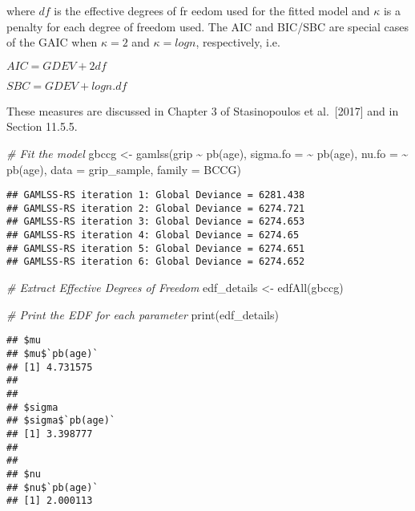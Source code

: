 \documentclass[
]{article}
\newenvironment{Shaded}{\begin{snugshade}}{\end{snugshade}}
\newcommand{\AttributeTok}[1]{\textcolor[rgb]{0.77,0.63,0.00}{#1}}
\newcommand{\CommentTok}[1]{\textcolor[rgb]{0.56,0.35,0.01}{\textit{#1}}}
\newcommand{\FunctionTok}[1]{\textcolor[rgb]{0.00,0.00,0.00}{#1}}
\newcommand{\NormalTok}[1]{#1}
\newcommand{\OtherTok}[1]{\textcolor[rgb]{0.56,0.35,0.01}{#1}}
\newcommand{\SpecialCharTok}[1]{\textcolor[rgb]{0.00,0.00,0.00}{#1}}
\begin{document}
where \(df\) is the effective degrees of fr eedom used for the fitted
model and \(\kappa\) is a penalty for each degree of freedom used. The
AIC and BIC/SBC are special cases of the GAIC when \(\kappa = 2\) and
\(\kappa = log n\), respectively, i.e.

\(AIC = GDEV + 2 df\)

\(SBC = GDEV + log n . df\)

These measures are discussed in Chapter 3 of Stasinopoulos et
al.~{[}2017{]} and in Section 11.5.5.

\begin{Shaded}
\begin{Highlighting}[]
\CommentTok{\# Fit the model}
\NormalTok{gbccg }\OtherTok{\textless{}{-}} \FunctionTok{gamlss}\NormalTok{(grip }\SpecialCharTok{\textasciitilde{}} \FunctionTok{pb}\NormalTok{(age),}
                \AttributeTok{sigma.fo =} \SpecialCharTok{\textasciitilde{}} \FunctionTok{pb}\NormalTok{(age),}
                \AttributeTok{nu.fo =} \SpecialCharTok{\textasciitilde{}} \FunctionTok{pb}\NormalTok{(age),}
                \AttributeTok{data =}\NormalTok{ grip\_sample,}
                \AttributeTok{family =}\NormalTok{ BCCG)}
\end{Highlighting}
\end{Shaded}

\begin{verbatim}
## GAMLSS-RS iteration 1: Global Deviance = 6281.438 
## GAMLSS-RS iteration 2: Global Deviance = 6274.721 
## GAMLSS-RS iteration 3: Global Deviance = 6274.653 
## GAMLSS-RS iteration 4: Global Deviance = 6274.65 
## GAMLSS-RS iteration 5: Global Deviance = 6274.651 
## GAMLSS-RS iteration 6: Global Deviance = 6274.652
\end{verbatim}

\begin{Shaded}
\begin{Highlighting}[]
\CommentTok{\# Extract Effective Degrees of Freedom}
\NormalTok{edf\_details }\OtherTok{\textless{}{-}} \FunctionTok{edfAll}\NormalTok{(gbccg)}

\CommentTok{\# Print the EDF for each parameter}
\FunctionTok{print}\NormalTok{(edf\_details)}
\end{Highlighting}
\end{Shaded}

\begin{verbatim}
## $mu
## $mu$`pb(age)`
## [1] 4.731575
## 
## 
## $sigma
## $sigma$`pb(age)`
## [1] 3.398777
## 
## 
## $nu
## $nu$`pb(age)`
## [1] 2.000113
\end{verbatim}
\end{document}
